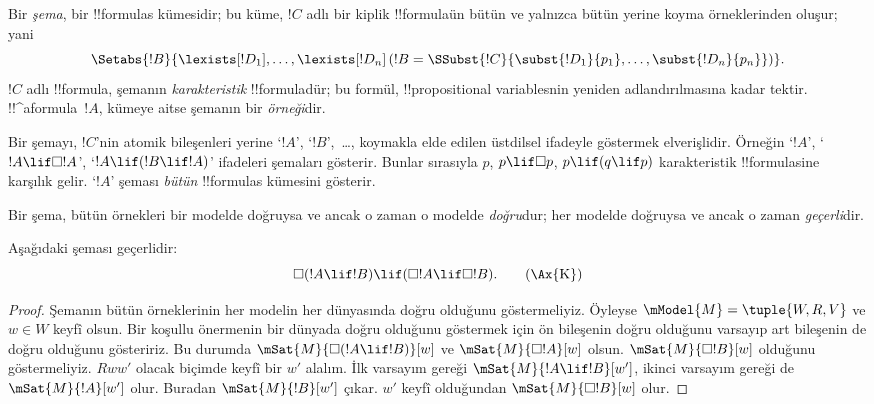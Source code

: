 \documentclass[../../../include/open-logic-section]{subfiles}
\begin{document}


\begin{defn}
  Bir \emph{şema}, bir !!{formula}s kümesidir; bu küme, $!C$ adlı bir kiplik
  !!{formula}{}ün bütün ve yalnızca bütün yerine koyma örneklerinden oluşur;
  yani
  \[
  \Setabs{!B}{\lexists[!D_1], \dots, \lexists[!D_n] \left(!B =
  \SSubst{!C}{\subst{!D_1}{p_1}, \dots, \subst{!D_n}{p_n}} \right) }.
  \]
  $!C$ adlı !!{formula}, şemanın \emph{karakteristik} !!{formula}{}dür;
  bu formül, !!{propositional variable}s{}nin yeniden adlandırılmasına kadar
  tektir. !!^a{formula}~$!A$, kümeye aitse şemanın bir \emph{örneği}dir.
\end{defn}

Bir şemayı, $!C$'nin atomik bileşenleri yerine `$!A$', `$!B$',~\dots,
koymakla elde edilen üstdilsel ifadeyle göstermek elverişlidir. Örneğin
`$!A$', `$!A \lif \Box!A$', `$!A \lif (!B \lif !A)$' ifadeleri şemaları
gösterir. Bunlar sırasıyla $p$, $p \lif \Box p$, $p \lif (q \lif p)$
karakteristik !!{formula}s{}ine karşılık gelir. `$!A$' şeması \emph{bütün}
!!{formula}s kümesini gösterir.

\begin{defn}
  Bir şema, bütün örnekleri bir modelde doğruysa ve ancak o zaman o modelde
  \emph{doğru}dur; her modelde doğruysa ve ancak o zaman \emph{geçerli}dir.
\end{defn}

\begin{prop}
  Aşağıdaki  şeması geçerlidir:
  \begin{equation*}
  \Box(!A \lif !B) \lif (\Box !A \lif \Box !B). \tag{\Ax{K}}
  \end{equation*}
\end{prop}

\begin{proof}
  Şemanın bütün örneklerinin her modelin her dünyasında doğru olduğunu
  göstermeliyiz. Öyleyse $\mModel{M} = \tuple{W,R,V}$ ve $w \in W$ keyfî
  olsun. Bir koşullu önermenin bir dünyada doğru olduğunu göstermek için ön
  bileşenin doğru olduğunu varsayıp art bileşenin de doğru olduğunu
  gösteririz. Bu durumda $\mSat{M}{\Box(!A \lif !B)}[w]$ ve
  $\mSat{M}{\Box !A}[w]$ olsun. $\mSat{M}{\Box !B}[w]$ olduğunu
  göstermeliyiz. $Rww'$ olacak biçimde keyfî bir $w'$ alalım. İlk varsayım
  gereği $\mSat{M}{!A \lif !B}[w']$, ikinci varsayım gereği de
  $\mSat{M}{!A}[w']$ olur. Buradan $\mSat{M}{!B}[w']$ çıkar. $w'$ keyfî
  olduğundan $\mSat{M}{\Box !B}[w]$ olur.
\end{proof}
\end{document}
